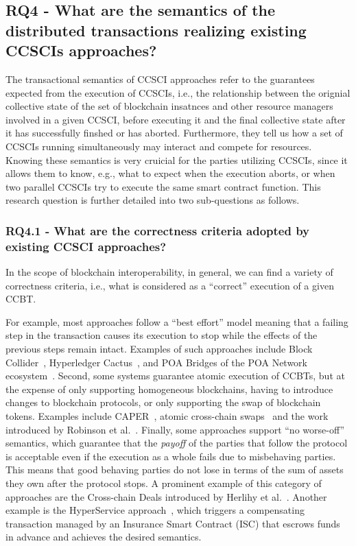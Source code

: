 \documentclass[review]{elsarticle}
\begin{document}
\subsection*{RQ4 - What are the semantics of the distributed transactions realizing existing CCSCIs approaches?}
The transactional semantics of CCSCI approaches refer to the guarantees expected from the execution of CCSCIs, i.e., the relationship between the orignial collective state of the set of blockchain insatnces and other resource managers involved in a given CCSCI, before executing it and the final collective state after it has successfully finshed or has aborted.
Furthermore, they tell us how a set of CCSCIs running simultaneously may interact and compete for resources.
Knowing these semantics is very cruicial for the parties utilizing CCSCIs, since it allows them to know, e.g., what to expect when the execution aborts, or when two parallel CCSCIs try to execute the same smart contract function.
This research question is further detailed into two sub-questions as follows.

\subsubsection*{RQ4.1 - What are the correctness criteria adopted by existing CCSCI approaches?}
In the scope of blockchain interoperability, in general, we can find a variety of correctness criteria, i.e., what is considered as a \enquote{correct} execution of a given CCBT.
 
For example, most approaches follow a \enquote{best effort} model meaning that a failing step in the transaction causes its execution to stop while the effects of the previous steps remain intact.
Examples of such approaches include Block Collider~\cite{Jain2018Collider}, Hyperledger Cactus~\cite{Montgomery2020Cactus}, and POA Bridges of the POA Network ecosystem~\cite{Barinov2018POA}.
Second, some systems guarantee atomic execution of CCBTs, but at the expense of only supporting homogeneous blockchains, having to introduce changes to blockchain protocols, or only supporting the swap of blockchain tokens.
Examples include CAPER~\cite{Amiri2019CAPER}, atomic cross-chain swaps~\cite{Herlihy2018AtomicCCSwaps} and the work introduced by Robinson et al.~\cite{Robinson2020AtomicCCTx}.
Finally, some approaches support \enquote{no worse-off} semantics, which guarantee that the \textit{payoff} of the parties that follow the protocol is acceptable even if the execution as a whole fails due to misbehaving parties.
This means that good behaving parties do not lose in terms of the sum of assets they own after the protocol stops.
A prominent example of this category of approaches are the Cross-chain Deals introduced by Herlihy et al.~\cite{Herlihy2019CCDeals}.
Another example is the HyperService approach~\cite{Liu2019Hyperservice}, which triggers a compensating transaction managed by an Insurance Smart Contract (ISC) that escrows funds in advance and achieves the desired semantics.
\end{document}
